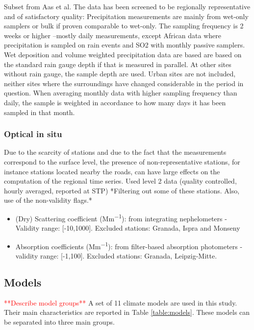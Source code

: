 \documentclass[journal abbreviation, manuscript]{copernicus}
\begin{document}
Subset from Aas et al.
The data has been screened to be regionally representative and of satisfactory quality:
Precipitation measurements are mainly from wet-only samplers or bulk if proven comparable to wet-only.
The sampling frequency is 2 weeks or higher –mostly daily measurements, except African data where precipitation is sampled on rain events and SO2 with monthly passive samplers.
Wet deposition and volume weighted precipitation data are based are based on the standard rain gauge depth if that is measured in parallel. At other sites without rain gauge, the sample depth are used.
Urban sites are not included, neither sites where the surroundings have changed considerable in the period in question.
When averaging monthly data with higher sampling frequency than daily, the sample is weighted in accordance to how many days it has been sampled in that month.

\subsubsection{Optical in situ}
Due to the scarcity of stations and due to the fact that the measurements correspond to the surface level, the presence of non-representative stations, for instance stations located nearby the roads, can have large effects on the computation of the regional time series. Used level 2 data (quality controlled, hourly averaged, reported at STP) *Filtering out some of these stations. Also, use of the non-validity flags.*

\begin{itemize}
 \item (Dry) Scattering coefficient (\unit{Mm^{-1}}): from integrating nephelometers - Validity range: [-10,1000]. Excluded stations: Granada, Ispra and Monseny
 \item Absorption coefficients (\unit{Mm^{-1}}): from filter-based absorption photometers - validity range: [-1,100]. Excluded stations: Granada, Leipzig-Mitte.
\end{itemize}

\subsection{Models}
\textcolor{red}{**Describe model groups**}
A set of 11 climate models are used in this study. Their main characteristics are reported in Table \ref{table:models}. These models can be separated into three main groups.
\end{document}
